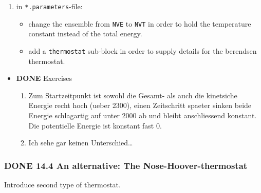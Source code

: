 \documentclass[11pt]{article}
\begin{document}
\begin{enumerate}
\item in \texttt{*.parameters}-file:

\begin{itemize}
\item change the ensemble from \texttt{NVE} to \texttt{NVT} in order to hold the temperature constant instead of the total energy.
\item add a \texttt{thermostat} sub-block in order to supply details for the berendsen thermostat.
\end{itemize}

\end{enumerate}
\begin{itemize}

\item \textbf{DONE} Exercises\\
\label{sec-2.4.3.1}

\begin{enumerate}
\item Zum Startzeitpunkt ist sowohl die Gesamt- als auch die kinetsiche Energie recht hoch (ueber 2300), einen Zeitschritt spaeter sinken beide Energie schlagartig auf unter 2000 ab und bleibt anschliessend konstant. Die potentielle Energie ist konstant fast 0.
\item Ich sehe gar keinen Unterschied\ldots{}
\end{enumerate}
\end{itemize} %
\subsubsection{\textbf{DONE} 14.4 An alternative: The Nose-Hoover-thermostat}
\label{sec-2.4.4}

      Introduce second type of thermostat. 
\end{document}
